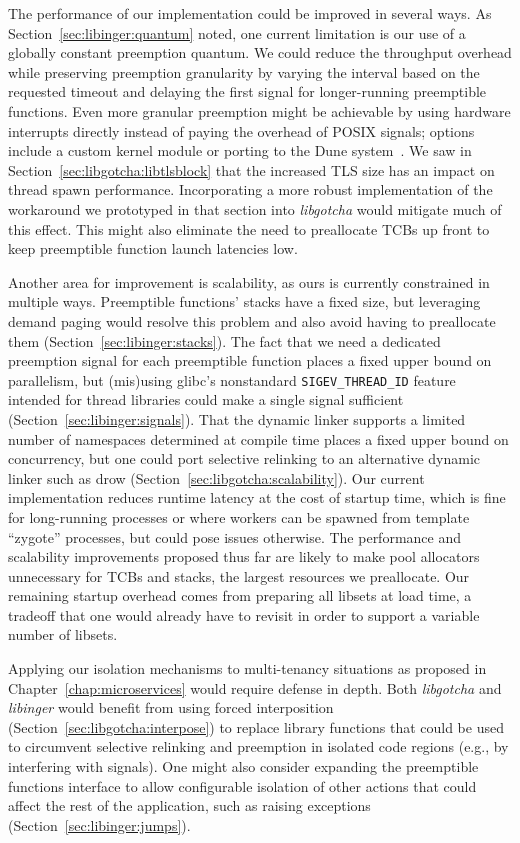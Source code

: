 The performance of our implementation could be improved in several ways.  As
Section~\ref{sec:libinger:quantum} noted, one current limitation is our use of a
globally constant preemption quantum.  We could reduce the throughput overhead while
preserving preemption granularity by varying the interval based on the requested
timeout and delaying the first signal for longer-running preemptible functions.  Even
more granular preemption might be achievable by using hardware interrupts directly
instead of paying the overhead of POSIX signals; options include a custom kernel
module or porting to the Dune system~\cite{Belay:osdi2012}.  We saw in
Section~\ref{sec:libgotcha:libtlsblock} that the increased TLS size has an impact on
thread spawn performance.  Incorporating a more robust implementation of the
workaround we prototyped in that section into \textit{libgotcha} would mitigate much
of this effect.  This might also eliminate the need to preallocate TCBs up front to
keep preemptible function launch latencies low.

Another area for improvement is scalability, as ours is currently constrained in
multiple ways.  Preemptible functions' stacks have a fixed size, but leveraging
demand paging would resolve this problem and also avoid having to preallocate them
(Section~\ref{sec:libinger:stacks}).  The fact that we need a dedicated preemption
signal for each preemptible function places a fixed upper bound on parallelism, but
(mis)using glibc's nonstandard \texttt{SIGEV\_THREAD\_ID} feature intended for thread
libraries could make a single signal sufficient (Section~\ref{sec:libinger:signals}).
That the dynamic linker supports a limited number of namespaces determined at compile
time places a fixed upper bound on concurrency, but one could port selective
relinking to an alternative dynamic linker such as drow
(Section~\ref{sec:libgotcha:scalability}).  Our current implementation reduces
runtime latency at the cost of startup time, which is fine for long-running processes
or where workers can be spawned from template ``zygote'' processes, but could pose
issues otherwise.  The performance and scalability improvements proposed thus far are
likely to make pool allocators unnecessary for TCBs and stacks, the largest resources
we preallocate.  Our remaining startup overhead comes from preparing all libsets at
load time, a tradeoff that one would already have to revisit in order to support a
variable number of libsets.

Applying our isolation mechanisms to multi-tenancy situations as proposed in
Chapter~\ref{chap:microservices} would require defense in depth.  Both
\textit{libgotcha} and \textit{libinger} would benefit from using forced
interposition (Section~\ref{sec:libgotcha:interpose}) to replace library functions
that could be used to circumvent selective relinking and preemption in isolated code
regions (e.g., by interfering with signals).  One might also consider expanding the
preemptible functions interface to allow configurable isolation of other actions that
could affect the rest of the application, such as raising exceptions
(Section~\ref{sec:libinger:jumps}).

